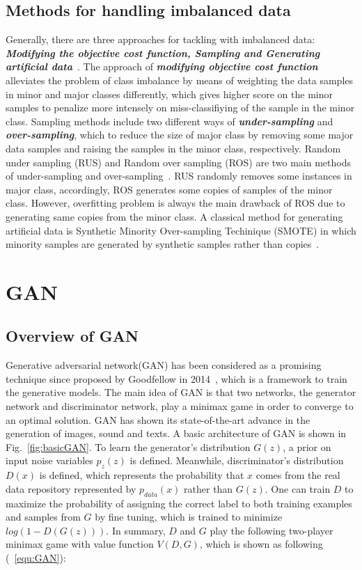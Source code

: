 \documentclass[letterpaper,12pt]{article}
\begin{document}
\subsection{Methods for handling imbalanced data}
Generally, there are three approaches for tackling with imbalanced data: \emph{\textbf{Modifying the objective cost function, Sampling and Generating artificial data}}~\cite{Vu2016}. The approach of \emph{\textbf{modifying objective cost function}} alleviates the problem of class imbalance by means of weighting the data samples in minor and major classes differently, which gives higher score on the minor samples to penalize more intensely on miss-classifiying of the sample in the minor class. Sampling methods include two different ways of \emph{\textbf{under-sampling}} and \emph{\textbf{over-sampling}}, which to reduce the size of major class by removing some major data samples and raising the samples in the minor class, respectively. Random under sampling (RUS) and Random over sampling (ROS) are two main methods of under-sampling and over-sampling~\cite{ROS2004}. RUS randomly removes some instances in major class, accordingly, ROS generates some copies of samples of the minor class. However, overfitting problem is always the main drawback of ROS due to generating same copies from the minor class. A classical method for generating artificial data is Synthetic Minority Over-sampling Techinique (SMOTE) in which minority samples are generated by synthetic samples rather than copies~\cite{SMOTE2002}.


\section{GAN}
\subsection{Overview of GAN}
Generative adversarial network(GAN) has been considered as a promising technique since proposed by Goodfellow in 2014~\cite{GAN2014}, which is a framework to train the generative models. The main idea of GAN is that two networks, the generator network and discriminator network, play a minimax game in order to converge to an optimal solution. GAN has shown its state-of-the-art advance in the generation of images, sound and texts. A basic architecture of GAN is shown in Fig.~\ref{fig:basicGAN}. To learn the generator's distribution $G(z)$, a prior on input noise variables $p_z(z)$ is defined. Meanwhile, discriminator's distribution $D(x)$ is defined, which represents the probability that $x$ comes from the real data repository  represented by $p_{data}(x)$ rather than $G(z)$. One can train $D$ to maximize the probability of assigning the correct label to both training examples and samples from $G$ by fine tuning, which is trained to minimize $log(1-D(G(z)))$. In summary, $D$ and $G$ play the following two-player minimax game with value function $V(D,G)$, which is shown as following (~\ref{equ:GAN}):
\end{document}
